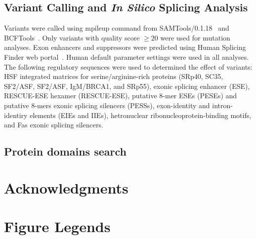 \documentclass[10pt]{article}
\begin{document}
\subsection{Variant Calling and {\em In Silico} Splicing Analysis} Variants were
called using mpileup command from SAMTools/0.1.18~\cite{} and BCFTools~\cite{}.
Only variants with quality score $\ge20$ were used for mutation analyses.  Exon
enhancers and suppressors were predicted using Human Splicing Finder web
portal~\cite{}.  Human default parameter settings were used in all analyses.
The following regulatory sequences were used to determined the effect of
variants: HSF integrated matrices for serine/arginine-rich proteins (SRp40,
SC35, SF2/ASF, SF2/ASF, IgM/BRCA1, and SRp55), exonic splicing enhancer (ESE),
RESCUE-ESE hexamer (RESCUE-ESE), putative 8-mer ESEs (PESEs) and putative 8-mers
exonic splicing silencers (PESSs), exon-identity and intron-identiry elements
(EIEs and IIEs), hetronuclear ribonucleoprotein-binding motifs, and Fas exonic
splicing silencers.

\subsection{Protein domains search}

\section*{Acknowledgments}

{}

\section*{Figure Legends}
\end{document}
